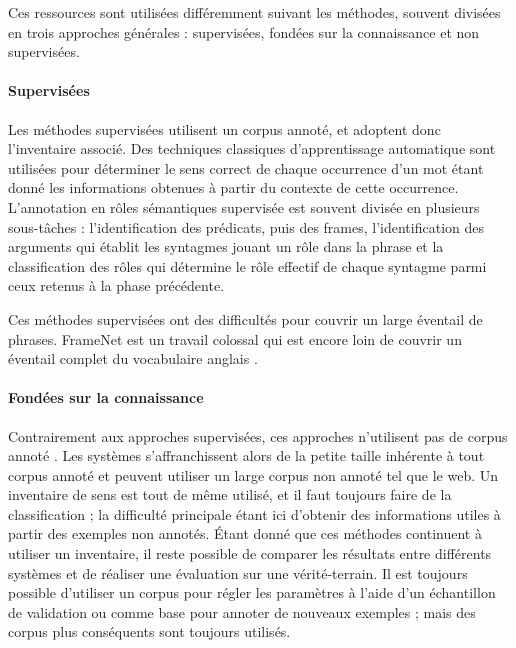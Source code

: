 Ces ressources sont utilisées différemment suivant les méthodes, souvent
divisées en trois approches générales : supervisées, fondées sur la
connaissance et non supervisées.

\paragraph{Supervisées}

Les méthodes supervisées
\citep{gildea2002automatic,surdeanu2008conll,das2014frame,hermann2014semantic}
utilisent un corpus annoté, et adoptent donc l'inventaire associé. Des
techniques classiques d'apprentissage automatique sont utilisées pour
déterminer le sens correct de chaque occurrence d'un mot étant donné les
informations obtenues à partir du contexte de cette occurrence.  L'annotation
en rôles sémantiques supervisée est souvent divisée en plusieurs sous-tâches :
l'identification des prédicats, puis des frames, l'identification des arguments
qui établit les syntagmes jouant un rôle dans la phrase et la classification
des rôles qui détermine le rôle effectif de chaque syntagme parmi ceux retenus
à la phase précédente.

Ces méthodes supervisées ont des difficultés pour couvrir un large éventail de
phrases. FrameNet est un travail colossal qui est encore loin de couvrir un
éventail complet du vocabulaire anglais \citep[p.~155]{marquez2008semantic}.





\paragraph{Fondées sur la connaissance}

Contrairement aux approches supervisées, ces approches n'utilisent pas de
corpus annoté \citep{swier2005exploiting,pradet2013revisiting}. Les systèmes
s'affranchissent alors de la petite taille inhérente à tout corpus annoté et
peuvent utiliser un large corpus non annoté tel que le web. Un inventaire de
sens est tout de même utilisé, et il faut toujours faire de la classification ;
la difficulté principale étant ici d'obtenir des informations utiles à partir
des exemples non annotés. Étant donné que ces méthodes continuent à utiliser un
inventaire, il reste possible de comparer les résultats entre différents
systèmes et de réaliser une évaluation sur une vérité-terrain. Il est toujours
possible d'utiliser un corpus pour régler les paramètres à l'aide d'un
échantillon de validation ou comme base pour annoter de nouveaux exemples ;
mais des corpus plus conséquents sont toujours utilisés.

